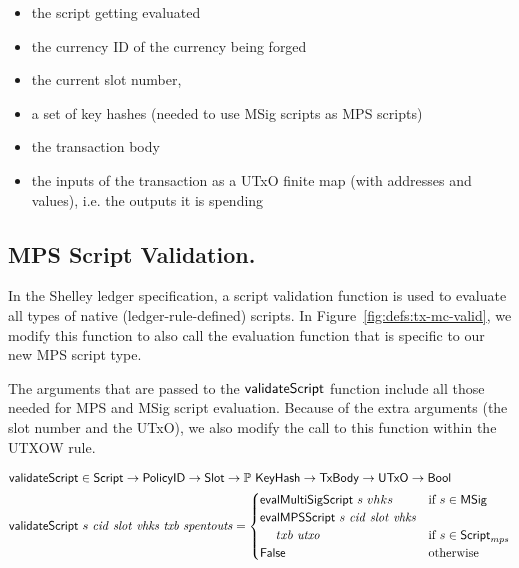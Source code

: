 \begin{itemize}
\item the script getting evaluated
\item the currency ID of the currency being forged
\item the current slot number,
\item a set of key hashes (needed to use MSig scripts as MPS scripts)
\item the transaction body
\item the inputs of the transaction as a UTxO finite map (with addresses and values),
i.e. the outputs it is spending
\end{itemize}


\subsection*{MPS Script Validation.}

In the Shelley ledger specification, a script validation function
is used to evaluate all types of native (ledger-rule-defined) scripts.
In Figure~\ref{fig:defs:tx-mc-valid}, we modify this function to also call the
evaluation function that is specific to our new MPS script type.

The arguments that are passed to the $\mathsf{validateScript}$ function include all those
needed for MPS and MSig script evaluation. Because of the extra arguments
(the slot number and the UTxO), we also modify the call to this function
within the UTXOW rule.

\begin{figure*}[htb]
    \begin{align*}
      \mathsf{validateScript} & \in\mathsf{Script}\to\mathsf{PolicyID}\to\mathsf{Slot}\to
      \mathbb{P}~\mathsf{KeyHash}\to\mathsf{TxBody}\to\mathsf{UTxO}\to\mathsf{Bool} \\
      \mathsf{validateScript} & ~s~\mathit{cid}~\mathit{slot}~\mathit{vhks}
       ~\mathit{txb}~\mathit{spentouts} =
                             \begin{cases}
                               \mathsf{evalMultiSigScript}~s~vhks & \text{if}~s \in\mathsf{MSig} \\
                               \mathsf{evalMPSScript}~s~\mathit{cid}~\mathit{slot}~\mathit{vhks} \\
                                ~~~~txb~\mathit{utxo} & \text{if}~s \in\mathsf{Script}_{mps} \\
                               \mathsf{False} & \text{otherwise}
                             \end{cases} \\
    \end{align*}
  \caption{Script Validation}
  \label{fig:defs:tx-mc-valid}
\end{figure*}

